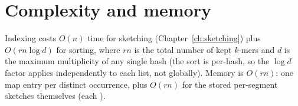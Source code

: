 \section{Complexity and memory}

Indexing costs $O(n)$ time for sketching (Chapter~\ref{ch:sketching}) plus $O(rn \log d)$ for
sorting, where $rn$ is the total number of kept $k$-mers and $d$ is the maximum multiplicity of
any single hash (the sort is per-hash, so the $\log d$ factor applies independently to each
list, not globally). Memory is $O(rn)$: one map entry per distinct occurrence, plus $O(rn)$ for the
stored per-segment sketches themselves (each ).

